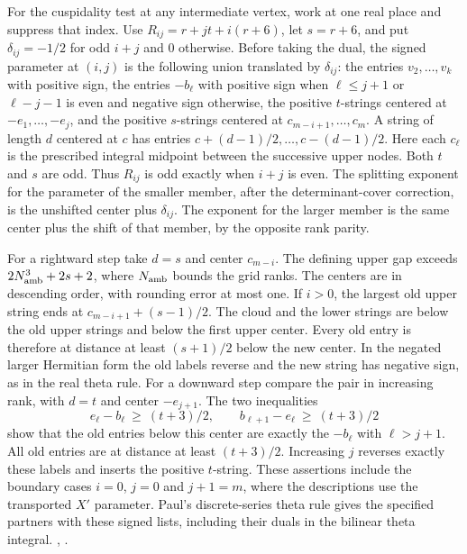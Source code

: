 For the cuspidality test at any intermediate vertex, work at
one real place and suppress that index. Use
\(R_{ij}=r+jt+i(r+6)\), let \(s=r+6\), and put
\(\delta_{ij}=-1/2\) for odd \(i+j\) and \(0\) otherwise.
Before taking the dual, the signed parameter at \((i,j)\) is
the following union translated by \(\delta_{ij}\):
the entries \(v_2,\ldots,v_k\) with positive sign,
the entries \(-b_\ell\) with positive sign when
\(\ell\le j+1\) or \(\ell-j-1\) is even and negative sign
otherwise, the positive \(t\)-strings centered at
\(-e_1,\ldots,-e_j\), and the positive \(s\)-strings centered
at \(c_{m-i+1},\ldots,c_m\). A string of length \(d\) centered
at \(c\) has entries \(c+(d-1)/2,\ldots,c-(d-1)/2\).
Here each \(c_\ell\) is the prescribed integral midpoint
between the successive upper nodes. Both \(t\) and \(s\) are
odd. Thus \(R_{ij}\) is odd exactly when \(i+j\) is even.
The splitting exponent for the parameter of the smaller
member, after the determinant-cover correction, is the
unshifted center plus \(\delta_{ij}\). The exponent for the
larger member is the same center plus the shift of that
member, by the opposite rank parity.

For a rightward step take \(d=s\) and center \(c_{m-i}\).
The defining upper gap exceeds \(2N_{\rm amb}^{3}+2s+2\),
where \(N_{\rm amb}\) bounds the grid ranks. The centers are
in descending order, with rounding error at most one.
If \(i>0\), the largest old upper string ends at
\(c_{m-i+1}+(s-1)/2\). The cloud and the lower strings are
below the old upper strings and below the first upper center. Every old entry is therefore at
distance at least \((s+1)/2\) below the new center. In the
negated larger Hermitian form the old labels reverse and the
new string has negative sign, as in the real theta rule.
For a downward step compare the pair in increasing rank,
with \(d=t\) and center \(-e_{j+1}\). The two inequalities
\[
 e_\ell-b_\ell\ \ge\ (t+3)/2,\qquad
 b_{\ell+1}-e_\ell\ \ge\ (t+3)/2
\]
show that the old entries below this center are exactly
the \(-b_\ell\) with \(\ell>j+1\). All old entries are at
distance at least \((t+3)/2\). Increasing \(j\) reverses
exactly these labels and inserts the positive \(t\)-string.
These assertions include the boundary cases \(i=0\), \(j=0\)
and \(j+1=m\), where the descriptions use the transported
\(X'\) parameter. Paul’s discrete-series theta rule gives
the specified partners with these signed lists, including
their duals in the bilinear theta integral.
\cite[Theorem~2.7(b) and Proposition~3.4(ii)]{p2paul-real-theta}
,
.

